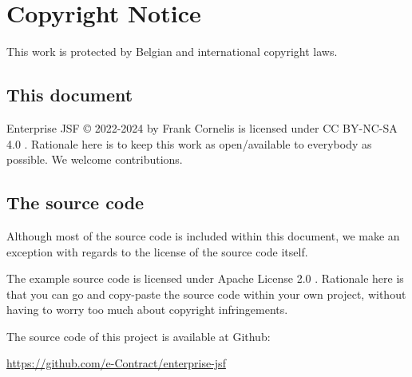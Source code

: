 %

\chapter*{Copyright Notice}
This work is protected by Belgian and international copyright laws.

\section*{This document}
Enterprise JSF © 2022-2024 by Frank Cornelis is licensed under CC BY-NC-SA 4.0 \cite{CCLicense}.
Rationale here is to keep this work as open/available to everybody as possible.
We welcome contributions.

\section*{The source code}
Although most of the source code is included within this document,
we make an exception with regards to the license of the source code itself.

The example source code is licensed under Apache License 2.0 \cite{ApacheLicense}.
Rationale here is that you can go and copy-paste the source code within your own project,
without having to worry too much about copyright infringements.

The source code of this project is available at Github:

\url{https://github.com/e-Contract/enterprise-jsf}